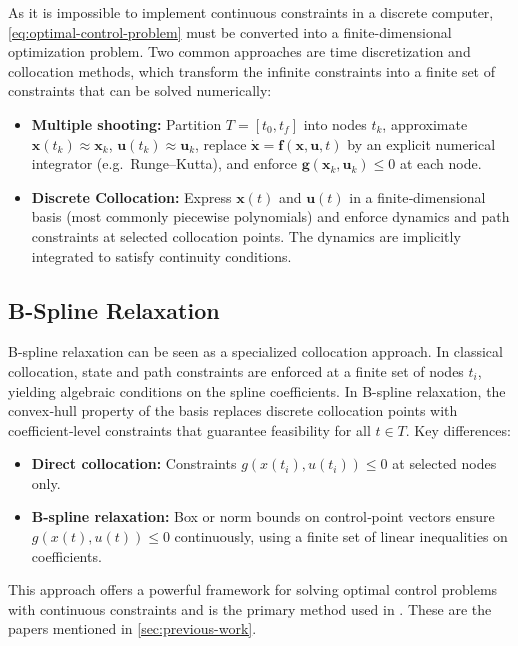 As it is impossible to implement continuous constraints in a discrete computer, \eqref{eq:optimal-control-problem} must be converted into a finite-dimensional optimization problem. Two common approaches are time discretization and collocation methods, which transform the infinite constraints into a finite set of constraints that can be solved numerically:
\begin{itemize}
  \item \textbf{Multiple shooting:}  
    Partition $T=[t_0,t_f]$ into nodes $t_k$, approximate $\mathbf x(t_k)\approx\mathbf x_k$, $\mathbf u(t_k)\approx\mathbf u_k$, replace $\dot{\mathbf x}=\mathbf f(\mathbf x,\mathbf u,t)$ by an explicit numerical integrator (e.g.\ Runge–Kutta), and enforce $\mathbf g(\mathbf x_k,\mathbf u_k)\le0$ at each node.
  \item \textbf{Discrete Collocation:}  
    Express $\mathbf x(t)$ and $\mathbf u(t)$ in a finite‐dimensional basis (most commonly piecewise polynomials) and enforce dynamics and path constraints at selected collocation points. The dynamics are implicitly integrated to satisfy continuity conditions.
\end{itemize}

 
\subsection{B-Spline Relaxation}\label{sec:b-spline-relaxation}
B-spline relaxation can be seen as a specialized collocation approach. In classical collocation, state and path constraints are enforced at a finite set of nodes $t_i$, yielding algebraic conditions on the spline coefficients. In B-spline relaxation, the convex‐hull property of the basis replaces discrete collocation points with coefficient‐level constraints that guarantee feasibility for all $t\in T$. Key differences:
\begin{itemize}
  \item \textbf{Direct collocation:}  
    Constraints $g(x(t_i),u(t_i))\le0$ at selected nodes only.
  \item \textbf{B-spline relaxation:}  
    Box or norm bounds on control‐point vectors ensure $g(x(t),u(t))\le0$ continuously, using a finite set of linear inequalities on coefficients.
\end{itemize}

This approach offers a powerful framework for solving optimal control problems with continuous constraints and is the primary method used in \citet{usenko2017real,mercy2016spline,cho2021colreg,zhang2021real}. These are the papers mentioned in \cref{sec:previous-work}. 


